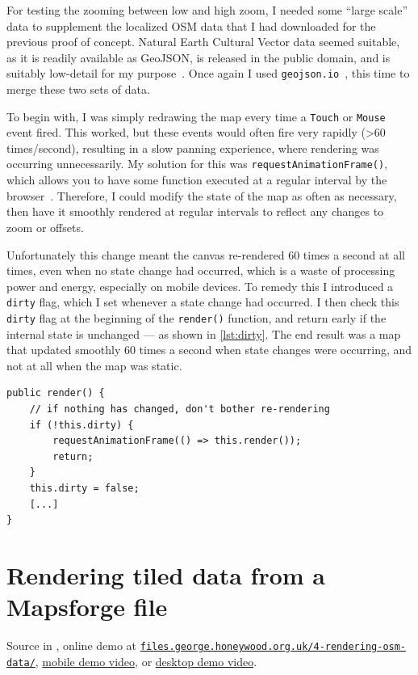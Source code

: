 \documentclass[hyphens]{final_report}
\begin{document}
For testing the zooming between low and high zoom, I needed some ``large scale'' data to supplement the localized OSM data that I had downloaded for the previous proof of concept. Natural Earth Cultural Vector data seemed suitable, as it is readily available as GeoJSON, is released in the public domain, and is suitably low-detail for my purpose~\cite{natural-earth}. Once again I used \texttt{geojson.io}~\cite{geojson.io}, this time to merge these two sets of data.

To begin with, I was simply redrawing the map every time a \texttt{Touch} or \texttt{Mouse} event fired. This worked, but these events would often fire very rapidly (>60 times/second), resulting in a slow panning experience, where rendering was occurring unnecessarily. My solution for this was \texttt{requestAnimationFrame()}, which allows you to have some function executed at a regular interval by the browser~\cite{mdn-request-animation-frame}. Therefore, I could modify the state of the map as often as necessary, then have it smoothly rendered at regular intervals to reflect any changes to zoom or offsets.

Unfortunately this change meant the canvas re-rendered 60 times a second at all times, even when no state change had occurred, which is a waste of processing power and energy, especially on mobile devices. To remedy this I introduced a \texttt{dirty} flag, which I set whenever a state change had occurred. I then check this \texttt{dirty} flag at the beginning of the \texttt{render()} function, and return early if the internal state is unchanged --- as shown in \autoref{lst:dirty}. The end result was a map that updated smoothly 60 times a second when state changes were occurring, and not at all when the map was static.

\begin{lstlisting}[caption=Only rendering when the map state is \texttt{dirty}, label=lst:dirty]
public render() {
    // if nothing has changed, don't bother re-rendering
    if (!this.dirty) {
        requestAnimationFrame(() => this.render());
        return;
    }
    this.dirty = false;
    [...]
}
\end{lstlisting}

\section{Rendering tiled data from a Mapsforge file}\label{sec:poc-4}

{ \footnotesize Source in , online demo at \href{https://files.george.honeywood.org.uk/4-rendering-osm-data/#15/50.7895/-1.8938}{\nolinkurl{files.george.honeywood.org.uk/4-rendering-osm-data/}}, \href{https://youtu.be/2cvZ-veBUto}{mobile demo video}, or \href{https://youtu.be/0evN3RT42QQ}{desktop demo video}.}
\end{document}
